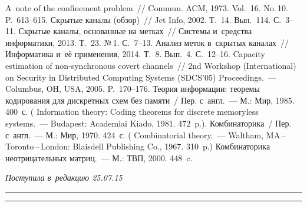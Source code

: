\begin{multicols}{2}
{\small\frenchspacing
 {%
 \begin{thebibliography}{9}
     A~note of the confinement problem~// 
Commun. ACM, 1973. Vol.~16. No.\,10. P.~613--615.
     Скрытые каналы (обзор)~// Jet Info, 2002. Т.~14. 
Вып.~114. С.~3--11.
     Скрытые каналы, основанные на метках~// Системы 
и~средства информатики, 2013. Т.~23. №\,1. С.~7--13.
     Анализ меток в~скрытых 
каналах~// Информатика и~её применения, 2014. Т.~8. Вып.~4. С.~12--16.
     Capacity estimation of non-synchronous 
covert channels~// 2nd Workshop (International) on Security in Distributed 
Computing Systems (SDCS'05) Proceedings.~--- Columbus, OH, USA, 2005. 
P.~170--176. 
     Теория информации: теоремы кодирования для 
дискретных схем без памяти~/ Пер. с~англ.~--- М.: Мир, 1985. 400~с. 
( Information theory: Coding theorems for discrete 
memoryless systems.~--- Budapest: Academiai Kiado, 1981. 472~p.).
     Комбинаторика~/ Пер. с~англ.~--- М.: Мир, 1970. 424~с. 
( Combinatorial theory.~--- Waltham, MA\,--\,Toronto\,--\,London: 
Blaisdell Publishing Co., 1967. 310~p.) 
     Комбинаторика неотрицательных 
мат\-риц.~--- М.: ТВП, 2000. 448~c.
 \end{thebibliography}

 }
 }

\end{multicols}

\vspace*{-3pt}

\hfill{\small\textit{Поступила в~редакцию 25.07.15}}

\vspace*{8pt}



\hrule

\vspace*{2pt}

\hrule

\vspace*{8pt}

\def\tit{RATE OF INFORMATION TRANSFER AND~CAPACITY 
IN~COVERT~CHANNELS DEFINED BY~TAGS}

